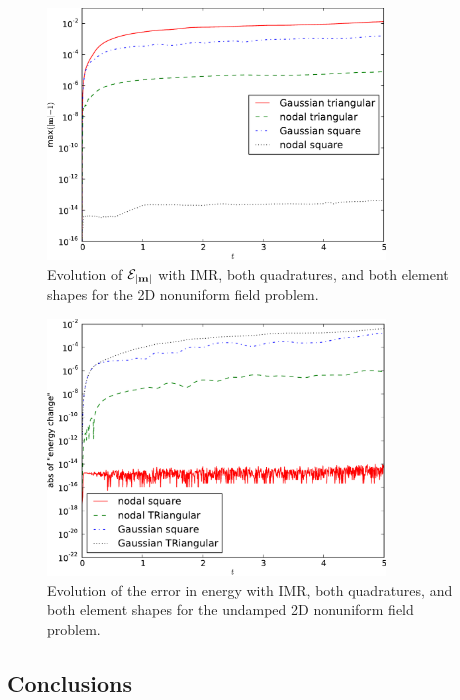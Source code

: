 \begin{figure}
  \centering
  \includegraphics[width=0.8\textwidth]
  {plots/nonuniform-h-triangles-ml/mlengtherrormaxesvstimes.pdf}
  \caption{
    Evolution of $\mathcal{E}_{\left|{\boldsymbol{\mathrm{m}}} \right|}$
    with IMR, both quadratures, and both element shapes
    for the 2D nonuniform field problem.
}
  \label{fig:ml-error-triangle-mesh}
\end{figure}

\begin{figure}
  \centering
  \includegraphics[width=0.8\textwidth]
  {plots/nonuniform-h-triangles-energy-error/absofenergychangevstimes.pdf}
  \caption{
    Evolution of the error in energy
    with IMR, both quadratures, and both element shapes
    for the undamped 2D nonuniform field problem.
  }
  \label{fig:energy-error-triangle-mesh}
\end{figure}

\subsection{Conclusions}

